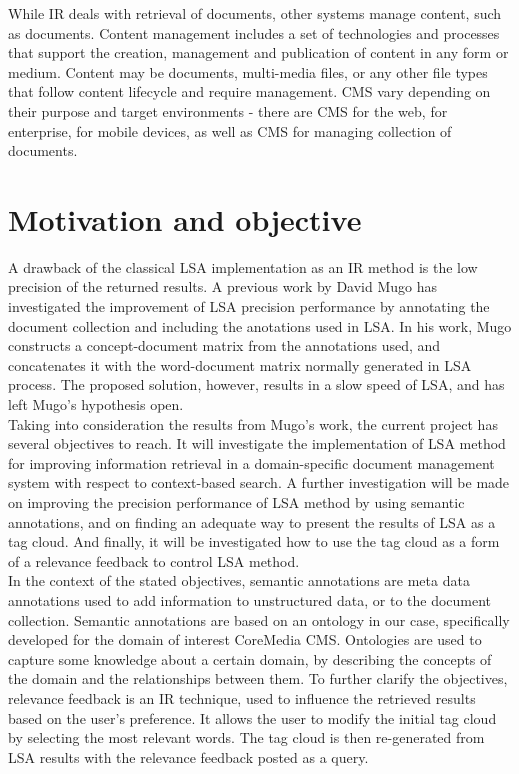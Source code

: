 While \gls{IR} deals with retrieval of documents, other systems manage content, such as documents. Content management includes a set of technologies and processes that support the creation, management and publication of content in any form or medium. Content may be documents, multi-media files, or any other file types that follow content lifecycle and require management. \gls{CMS} vary depending on their purpose and target environments - there are \gls{CMS} for the web, for enterprise, for mobile devices, as well as \gls{CMS} for managing collection of documents. \\

\section{Motivation and objective}
\label{sec:introduction:motandobj}  
A drawback of the classical \gls{LSA} implementation as an \gls{IR} method is the low precision of the returned results. A previous work by David Mugo \cite{mugo10} has investigated the improvement of \gls{LSA} precision performance by annotating the document collection and including the anotations used in \gls{LSA}. In his work, Mugo constructs a concept-document matrix from the annotations used, and concatenates it with the word-document matrix normally generated in \gls{LSA} process. The proposed solution, however, results in a slow speed of \gls{LSA}, and has left Mugo's hypothesis open. \\

Taking into consideration the results from Mugo's work, the current project has several objectives to reach. It will investigate the implementation of \gls{LSA} method for improving information retrieval in a domain-specific document management system with respect to context-based search. A further investigation will be made on improving the precision performance of \gls{LSA} method by using semantic annotations, and on finding an adequate way to present the results of \gls{LSA} as a tag cloud. And finally, it will be investigated how to use the tag cloud as a form of a relevance feedback to control \gls{LSA} method. \\

In the context of the stated objectives, semantic annotations are meta data annotations used to add information to unstructured data, or to the document collection. Semantic annotations are based on an ontology in our case, specifically developed for the domain of interest CoreMedia \gls{CMS}. Ontologies are used to capture some knowledge about a certain domain, by describing the concepts of the domain and the relationships between them. To further clarify the objectives, relevance feedback is an \gls{IR} technique, used to influence the retrieved results based on the user's preference. It allows the user to modify the initial tag cloud by selecting the most relevant words. The tag cloud is then re-generated from \gls{LSA} results with the relevance feedback posted as a query. \\

